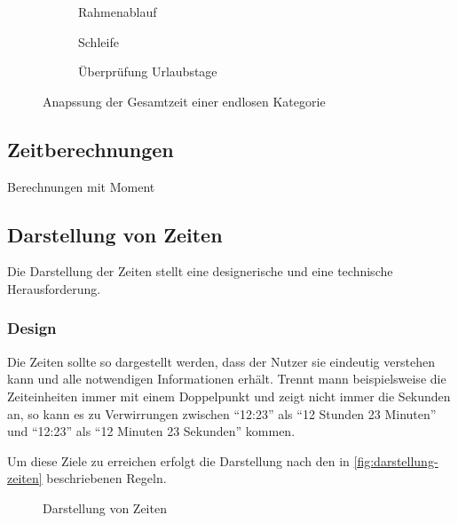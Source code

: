 \begin{figure}
    \begin{subfigure}{0.5\textwidth}
        \resizebox{0.9\linewidth}{!}{
            
        }
		\caption{Rahmenablauf}
	\end{subfigure}
	\begin{subfigure}{0.5\textwidth}
        \resizebox{0.9\linewidth}{!}{
            
        }
		\caption{Schleife}
    \end{subfigure}
    \begin{subfigure}{\textwidth}
        \resizebox{\linewidth}{!}{
            
        }
		\caption{Überprüfung Urlaubstage}
	\end{subfigure}
	\caption{Anapssung der Gesamtzeit einer endlosen Kategorie}
	\label{fig:anpassung-endlos}
\end{figure}



\subsection{Zeitberechnungen}
Berechnungen mit Moment

\subsection{Darstellung von Zeiten}
Die Darstellung der Zeiten stellt eine designerische und eine technische Herausforderung.

\subsubsection{Design}
Die Zeiten sollte so dargestellt werden,
dass der Nutzer sie eindeutig verstehen kann und alle notwendigen Informationen erhält.
Trennt mann beispielsweise die Zeiteinheiten immer mit einem Doppelpunkt und zeigt nicht immer die Sekunden an,
so kann es zu Verwirrungen zwischen \enquote{12:23} als \enquote{12 Stunden 23 Minuten}
und \enquote{12:23} als \enquote{12 Minuten 23 Sekunden} kommen.

Um diese Ziele zu erreichen erfolgt die Darstellung nach den in \autoref{fig:darstellung-zeiten} beschriebenen Regeln.

\begin{figure}[ht!]
    \centering
    \resizebox{\textwidth}{!}{
        
    }
    \caption{Darstellung von Zeiten}
    \label{fig:darstellung-zeiten}
\end{figure}


